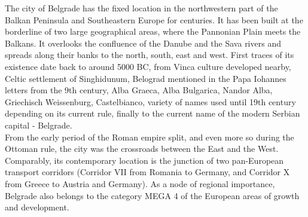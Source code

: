 \documentclass[11pt]{report}
\begin{document}
The city of Belgrade has the fixed location in the northwestern part of the Balkan Peninsula and Southeastern Europe for centuries. It  has  been  built  at  the borderline of two large geographical areas, where the Pannonian Plain meets the Balkans. It overlooks the confluence of the Danube and the Sava rivers and spreads along their banks to the north, south, east and west. First traces of its existence date back to around 5000 BC, from Vinca culture developed nearby, Celtic settlement of Singhidunum, Belograd mentioned in the Papa Iohannes letters from the 9th century,
Alba  Graeca,  Alba  Bulgarica,  Nandor  Alba,  Griechisch Weissenburg, Castelbianco, variety of names used until 19th century depending on its current rule, finally to the current name of the modern Serbian capital - Belgrade.
\\

From the early period of the Roman empire split, and even more so during the Ottoman rule, the city was the crossroads between the East and the West. Comparably, its contemporary location is the junction of two pan-European transport corridors (Corridor VII from Romania to Germany, and Corridor X from Greece to Austria and Germany). As a node of regional importance, Belgrade also belongs to the category MEGA 4 of the European areas of growth and development.
\\
\end{document}
